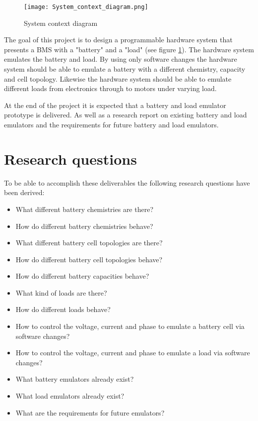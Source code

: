 \begin{figure}[ht]
    \centering
    \texttt{[image: System\_context\_diagram.png]}
    \caption{System context diagram}
    \label{fig:system_context_diagram}
\end{figure}

The goal of this project is to design a programmable hardware system that presents a BMS with a "battery" and a "load" (see figure \ref{fig:system_context_diagram}). The hardware system emulates the battery and load. By using only software changes the hardware system should be able to emulate a battery with a different chemistry, capacity and cell topology. Likewise the hardware system should be able to emulate different loads from electronics through to motors under varying load.

At the end of the project it is expected that a battery and load emulator prototype is delivered. As well as a research report on existing battery and load emulators and the requirements for future battery and load emulators.

\section{Research questions}
To be able to accomplish these deliverables the following research questions have been derived:
\begin{itemize}
    \item What different battery chemistries are there?
    \item How do different battery chemistries behave?
    \item What different battery cell topologies are there?
    \item How do different battery cell topologies behave?
    \item How do different battery capacities behave?
    \item What kind of loads are there?
    \item How do different loads behave?
    \item How to control the voltage, current and phase to emulate a battery cell via software changes?
    \item How to control the voltage, current and phase to emulate a load via software changes?
    \item What battery emulators already exist?
    \item What load emulators already exist?
    \item What are the requirements for future emulators?
\end{itemize}


